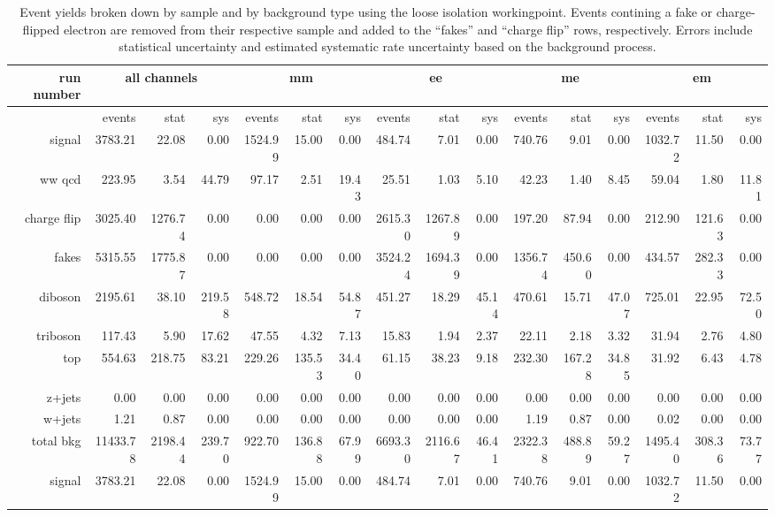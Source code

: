 \begin{sidewaystable}[!htbp]
  {\scriptsize
    \begin{tabular}{r|rrr|rrr|rrr|rrr|rrr}
      run number&\multicolumn{3}{c|}{all channels}&\multicolumn{3}{c|}{mm}&\multicolumn{3}{c|}{ee}&\multicolumn{3}{c|}{me}&\multicolumn{3}{c}{em}\\
      \hline
      &events&stat&sys&events&stat&sys&events&stat&sys&events&stat&sys&events&stat&sys\\
      \hline\hline
      signal&3783.21&22.08&0.00&1524.99&15.00&0.00&484.74&7.01&0.00&740.76&9.01&0.00&1032.72&11.50&0.00\\
      
      ww qcd&223.95&3.54&44.79&97.17&2.51&19.43&25.51&1.03&5.10&42.23&1.40&8.45&59.04&1.80&11.81\\
      
      charge flip&3025.40&1276.74&0.00&0.00&0.00&0.00&2615.30&1267.89&0.00&197.20&87.94&0.00&212.90&121.63&0.00\\
      
      fakes&5315.55&1775.87&0.00&0.00&0.00&0.00&3524.24&1694.39&0.00&1356.74&450.60&0.00&434.57&282.33&0.00\\
      
      diboson&2195.61&38.10&219.58&548.72&18.54&54.87&451.27&18.29&45.14&470.61&15.71&47.07&725.01&22.95&72.50\\
      
      triboson&117.43&5.90&17.62&47.55&4.32&7.13&15.83&1.94&2.37&22.11&2.18&3.32&31.94&2.76&4.80\\
      
      top&554.63&218.75&83.21&229.26&135.53&34.40&61.15&38.23&9.18&232.30&167.28&34.85&31.92&6.43&4.78\\
      
      z+jets&0.00&0.00&0.00&0.00&0.00&0.00&0.00&0.00&0.00&0.00&0.00&0.00&0.00&0.00&0.00\\
      
      w+jets&1.21&0.87&0.00&0.00&0.00&0.00&0.00&0.00&0.00&1.19&0.87&0.00&0.02&0.00&0.00\\
      \hline
      total bkg&11433.78&2198.44&239.70&922.70&136.88&67.99&6693.30&2116.67&46.41&2322.38&488.89&59.27&1495.40&308.36&73.77\\
      
      signal&3783.21&22.08&0.00&1524.99&15.00&0.00&484.74&7.01&0.00&740.76&9.01&0.00&1032.72&11.50&0.00\\
      \hline\hline
    \end{tabular}
  }
  \caption{Event yields broken down by sample and by background type using the loose isolation workingpoint.  Events contining a fake or charge-flipped electron are removed from their respective sample and added to the ``fakes'' and ``charge flip'' rows, respectively.  Errors include statistical uncertainty and estimated systematic rate uncertainty based on the background process.}
  \label{tab:EY_loose}
\end{sidewaystable}
